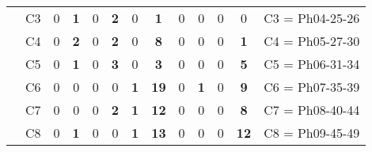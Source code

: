 \begin{table}[H]
{\begin{tabular}{|ccrrrrrrrrrrc|}
\multicolumn{1}{|c|}{}                                      & \multicolumn{1}{c|}{C3} & \multicolumn{1}{c|}{0}  & \multicolumn{1}{c|}{\textbf{1}}  & \multicolumn{1}{c|}{0}  & \multicolumn{1}{c|}{\textbf{2}}  & \multicolumn{1}{c|}{0}  & \multicolumn{1}{c|}{\textbf{1}}  & \multicolumn{1}{c|}{0}  & \multicolumn{1}{c|}{0}  & \multicolumn{1}{c|}{0}  & \multicolumn{1}{c|}{0}  & C3 = Ph04-25-26   \\ \cline{2-13}
\multicolumn{1}{|c|}{}                                      & \multicolumn{1}{c|}{C4} & \multicolumn{1}{c|}{0}  & \multicolumn{1}{c|}{\textbf{2}}  & \multicolumn{1}{c|}{0}  & \multicolumn{1}{c|}{\textbf{2}}  & \multicolumn{1}{c|}{0}  & \multicolumn{1}{c|}{\textbf{8}}  & \multicolumn{1}{c|}{0}  & \multicolumn{1}{c|}{0}  & \multicolumn{1}{c|}{0}  & \multicolumn{1}{c|}{\textbf{1}}  & C4 = Ph05-27-30   \\ \cline{2-13}
\multicolumn{1}{|c|}{}                                      & \multicolumn{1}{c|}{C5} & \multicolumn{1}{c|}{0}  & \multicolumn{1}{c|}{\textbf{1}}  & \multicolumn{1}{c|}{0}  & \multicolumn{1}{c|}{\textbf{3}}  & \multicolumn{1}{c|}{0}  & \multicolumn{1}{c|}{\textbf{3}}  & \multicolumn{1}{c|}{0}  & \multicolumn{1}{c|}{0}  & \multicolumn{1}{c|}{0}  & \multicolumn{1}{c|}{\textbf{5}}  & C5 = Ph06-31-34   \\ \cline{2-13}
\multicolumn{1}{|c|}{}                                      & \multicolumn{1}{c|}{C6} & \multicolumn{1}{c|}{0}  & \multicolumn{1}{c|}{0}  & \multicolumn{1}{c|}{0}  & \multicolumn{1}{c|}{0}  & \multicolumn{1}{c|}{\textbf{1}}  & \multicolumn{1}{c|}{\textbf{19}} & \multicolumn{1}{c|}{0}  & \multicolumn{1}{c|}{\textbf{1}}  & \multicolumn{1}{c|}{0}  & \multicolumn{1}{c|}{\textbf{9}}  & C6 = Ph07-35-39   \\ \cline{2-13}
\multicolumn{1}{|c|}{}                                      & \multicolumn{1}{c|}{C7} & \multicolumn{1}{c|}{0}  & \multicolumn{1}{c|}{0}  & \multicolumn{1}{c|}{0}  & \multicolumn{1}{c|}{\textbf{2}}  & \multicolumn{1}{c|}{\textbf{1}}  & \multicolumn{1}{c|}{\textbf{12}} & \multicolumn{1}{c|}{0}  & \multicolumn{1}{c|}{0}  & \multicolumn{1}{c|}{0}  & \multicolumn{1}{c|}{\textbf{8}}  & C7 = Ph08-40-44   \\ \cline{2-13}
\multicolumn{1}{|c|}{}                                      & \multicolumn{1}{c|}{C8} & \multicolumn{1}{c|}{0}  & \multicolumn{1}{c|}{\textbf{1}}  & \multicolumn{1}{c|}{0}  & \multicolumn{1}{c|}{0}  & \multicolumn{1}{c|}{\textbf{1}}  & \multicolumn{1}{c|}{\textbf{13}} & \multicolumn{1}{c|}{0}  & \multicolumn{1}{c|}{0}  & \multicolumn{1}{c|}{0}  & \multicolumn{1}{c|}{\textbf{12}} & C8 = Ph09-45-49   \\ \cline{2-13}

\end{tabular}}
\end{table}
